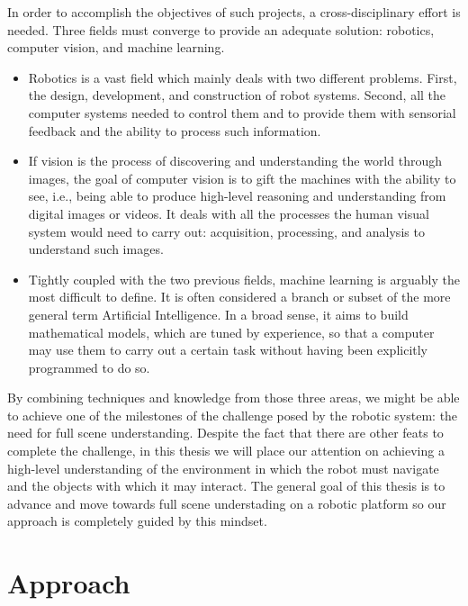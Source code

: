 In order to accomplish the objectives of such projects, a cross-disciplinary effort is needed. Three fields must converge to provide an adequate solution: robotics, computer vision, and machine learning.

\begin{itemize}
	\item Robotics is a vast field which mainly deals with two different problems. First, the design, development, and construction of robot systems. Second, all the computer systems needed to control them and to provide them with sensorial feedback and the ability to process such information.

	\item If vision is the process of discovering and understanding the world through images, the goal of computer vision is to gift the machines with the ability to see, i.e., being able to produce high-level reasoning and understanding from digital images or videos. It deals with all the processes the human visual system would need to carry out: acquisition, processing, and analysis to understand such images.

	\item Tightly coupled with the two previous fields, machine learning is arguably the most difficult to define. It is often considered a branch or subset of the more general term Artificial Intelligence. In a broad sense, it aims to build mathematical models, which are tuned by experience, so that a computer may use them to carry out a certain task without having been explicitly programmed to do so.
\end{itemize}

By combining techniques and knowledge from those three areas, we might be able to achieve one of the milestones of the challenge posed by the robotic system: the need for full scene understanding. Despite the fact that there are other feats to complete the challenge, in this thesis we will place our attention on achieving a high-level understanding of the environment in which the robot must navigate and the objects with which it may interact. The general goal of this thesis is to advance and move towards full scene understading on a robotic platform so our approach is completely guided by this mindset.

\section{Approach}
\label{cha:introduction:sec:approach}

